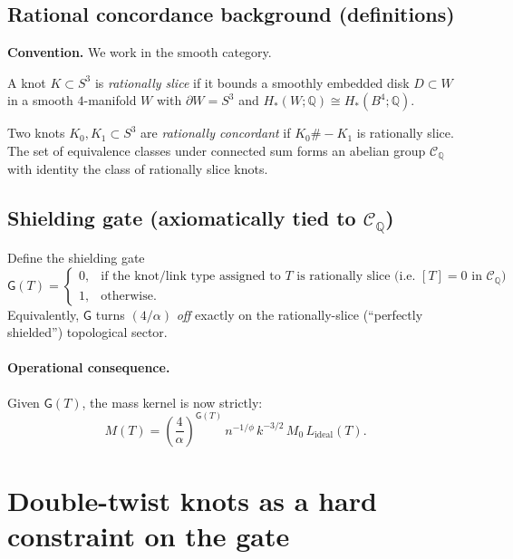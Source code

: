 \documentclass[11pt, a4paper]{article}
\begin{document}
\subsection{Rational concordance background (definitions)}
\textbf{Convention.} We work in the smooth category.

\begin{definition}\label{def:rationalslice}
A knot \(K\subset S^3\) is \emph{rationally slice} if it bounds a smoothly embedded disk \(D\subset W\) in a smooth \(4\)-manifold \(W\) with
\(\partial W=S^3\) and \(H_*(W;\mathbb{Q})\cong H_*(B^4;\mathbb{Q})\).
\end{definition}

\begin{definition}
Two knots \(K_0,K_1\subset S^3\) are \emph{rationally concordant} if \(K_0\#-K_1\) is rationally slice.
The set of equivalence classes under connected sum forms an abelian group \(\mathcal{C}_{\mathbb{Q}}\) with identity the class of rationally slice knots.
\end{definition}

\subsection{Shielding gate (axiomatically tied to \(\mathcal{C}_{\mathbb{Q}}\))}
\begin{definition}\label{def:gate}
Define the shielding gate
\[
\mathsf{G}(T)=
\begin{cases}
0,& \text{if the knot/link type assigned to }T\text{ is rationally slice (i.e. }[T]=0\text{ in }\mathcal{C}_{\mathbb{Q}}\text{)}\\
1,& \text{otherwise.}
\end{cases}
\]
Equivalently, \(\mathsf{G}\) turns \((4/\alpha)\) \emph{off} exactly on the rationally-slice (``perfectly shielded'') topological sector.
\end{definition}

\paragraph{Operational consequence.}
Given \(\mathsf{G}(T)\), the mass kernel is now strictly:
\[
M(T)=\left(\frac{4}{\alpha}\right)^{\mathsf{G}(T)}\,n^{-1/\phi}\,k^{-3/2}\,M_0\,L_{\mathrm{ideal}}(T).
\]

\section{Double-twist knots as a hard constraint on the gate}\label{sec:doubletwist}
\end{document}
